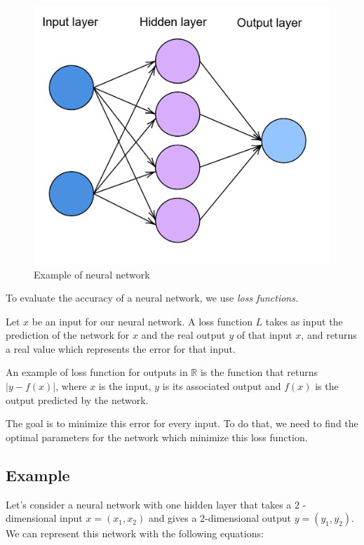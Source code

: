 \documentclass[10pt,a4paper]{article}
\theoremstyle{definition}
\theoremstyle{definition}
\theoremstyle{definition}
\begin{document}
\begin{figure}
\center
\includegraphics[scale=0.2]{nn.png}
\caption{Example of neural network}
\label{examplenn}
\end{figure}

\newpage

To evaluate the accuracy of a neural network, we use \textit{loss functions.} 

Let $x$ be an input for our neural network. A loss function $L$ takes as input the prediction of the network for $x$ and the real output $y$ of that input $x$, and returns a real value which represents the error for that input. 

An example of loss function for outputs in $\mathbb{R}$ is the function that returns $|y - f(x)|$, where $x$ is the input, $y$ is its associated output and $f(x)$ is the output predicted by the network.

The goal is to minimize this error for every input. To do that, we need to find the optimal parameters for the network which minimize this loss function.

\subsection{Example} \label{exnn}
Let's consider a neural network with one hidden layer that takes a 2 - dimensional input $x = (x_1, x_2)$ and gives a 2-dimensional output $y = (y_1,y_2)$. We can represent this network with the following equations:
\end{document}
